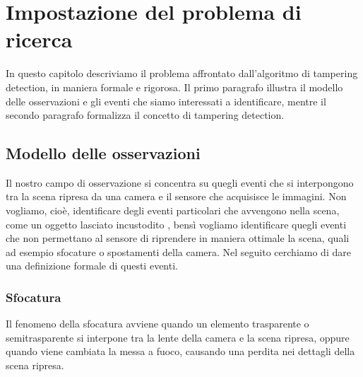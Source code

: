 \chapter{Impostazione del problema di ricerca}
\label{FormulazioneProblema}
\thispagestyle{empty}

\vspace{0.5cm}
In questo capitolo descriviamo il problema affrontato dall'algoritmo di tampering detection, in maniera formale e rigorosa. Il primo paragrafo illustra il modello delle osservazioni e gli eventi che siamo interessati a identificare, mentre il secondo paragrafo formalizza il concetto di tampering detection. 
\noindent 
\section{Modello delle osservazioni}
\label{modelloOsservaz}
Il nostro campo di osservazione si concentra su quegli eventi che si interpongono tra la scena ripresa da una camera e il sensore che acquisisce le immagini. Non vogliamo, cio\`e, identificare degli eventi particolari che avvengono nella scena, come un oggetto lasciato incustodito \cite{Targhe}, bens\`i vogliamo identificare quegli eventi che non permettano al sensore di riprendere in maniera ottimale la scena, quali ad esempio sfocature o spostamenti della camera.
Nel seguito cerchiamo di dare una definizione formale di questi eventi.
\subsection{Sfocatura}
\label{sfocatura}
Il fenomeno della sfocatura avviene quando un elemento trasparente o semitrasparente si interpone tra la lente della camera e la \gls{scena} ripresa, oppure quando viene cambiata la messa a fuoco, causando una perdita nei dettagli della \gls{scena} ripresa.


